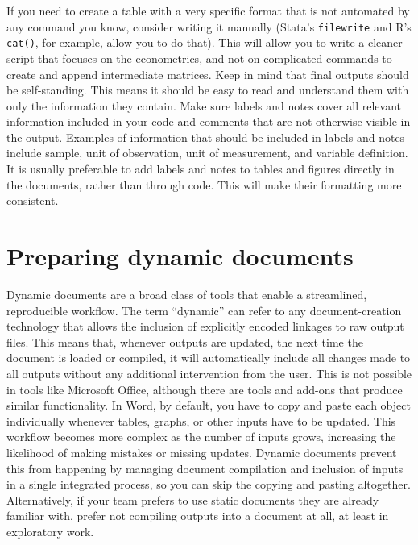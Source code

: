 If you need to create a table with a very specific format
that is not automated by any command you know, consider writing it manually
(Stata's \texttt{filewrite} and R's \texttt{cat()}, for example, allow you to do that).
This will allow you to write a cleaner script that focuses on the econometrics,
and not on complicated commands to create and append intermediate matrices.
Keep in mind that final outputs should be self-standing.
This means it should be easy to read and understand them with only the information they contain.
Make sure labels and notes cover all relevant information
included in your code and comments that are not otherwise visible in the output.
Examples of information that should be included in labels and notes include sample,
unit of observation, unit of measurement, and variable definition.
It is usually preferable to add labels and notes to tables and figures
directly in the documents, rather than through code.
This will make their formatting more consistent.

\section{Preparing dynamic documents}

Dynamic documents are a broad class of tools that enable a streamlined, reproducible workflow.
The term ``dynamic'' can refer to any document-creation technology
that allows the inclusion of explicitly encoded linkages to raw output files.
This means that, whenever outputs are updated,
the next time the document is loaded or compiled, it will automatically include
all changes made to all outputs without any additional intervention from the user.
This is not possible in tools like Microsoft Office,
although there are tools and add-ons that produce similar functionality.
In Word, by default, you have to copy and paste each object individually
whenever tables, graphs, or other inputs have to be updated.
This workflow becomes more complex as the number of inputs grows,
increasing the likelihood of making mistakes or missing updates.
Dynamic documents prevent this from happening by managing document compilation and
inclusion of inputs in a single integrated process,
so you can skip the copying and pasting altogether.
Alternatively, if your team prefers to use static documents they are already familiar with,
prefer not compiling outputs into a document at all,
at least in exploratory work.

